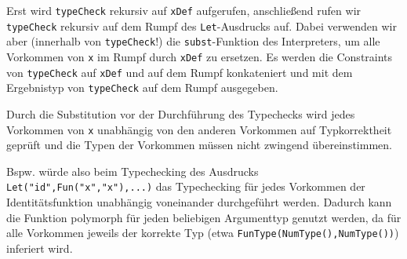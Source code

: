 \documentclass[]{article}
\begin{document}
Erst wird \texttt{typeCheck} rekursiv auf \texttt{xDef} aufgerufen,
anschließend rufen wir \texttt{typeCheck} rekursiv auf dem Rumpf des
\texttt{Let}-Ausdrucks auf. Dabei verwenden wir aber (innerhalb von
\texttt{typeCheck}!) die \texttt{subst}-Funktion des Interpreters, um
alle Vorkommen von \texttt{x} im Rumpf durch \texttt{xDef} zu ersetzen.
Es werden die Constraints von \texttt{typeCheck} auf \texttt{xDef} und
auf dem Rumpf konkateniert und mit dem Ergebnistyp von
\texttt{typeCheck} auf dem Rumpf ausgegeben.

Durch die Substitution vor der Durchführung des Typechecks wird jedes
Vorkommen von \texttt{x} unabhängig von den anderen Vorkommen auf
Typkorrektheit geprüft und die Typen der Vorkommen müssen nicht zwingend
übereinstimmen.

Bspw. würde also beim Typechecking des Ausdrucks
\texttt{Let("id",Fun("x","x"),...)} das Typechecking für jedes Vorkommen
der Identitätsfunktion unabhängig voneinander durchgeführt werden.
Dadurch kann die Funktion polymorph für jeden beliebigen Argumenttyp
genutzt werden, da für alle Vorkommen jeweils der korrekte Typ (etwa
\texttt{FunType(NumType(),NumType())}) inferiert wird.
\end{document}
